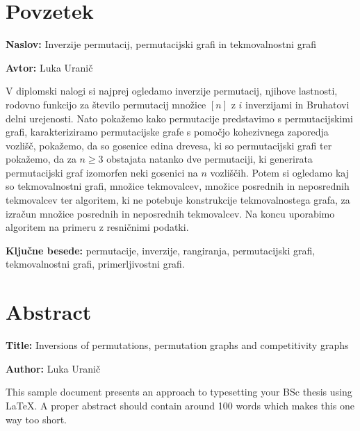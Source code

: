 \documentclass[a4paper, 12pt]{book}
\newcommand{\ttitle}{Inverzije permutacij, permutacijski grafi in tekmovalnostni grafi}
\newcommand{\ttitleEn}{Inversions of permutations, permutation graphs and competitivity graphs}
\newcommand{\tauthor}{Luka Uranič}
\newcommand{\tkeywords}{permutacije, inverzije, rangiranja, permutacijski grafi, tekmovalnostni grafi, primerljivostni grafi}
\newcommand{\clearemptydoublepage}{\newpage{\pagestyle{empty}\cleardoublepage}}
\begin{document}

\chapter*{Povzetek}

\noindent\textbf{Naslov:} \ttitle
\bigskip

\noindent\textbf{Avtor:} \tauthor
\bigskip

\noindent V diplomski nalogi si najprej ogledamo inverzije permutacij, njihove lastnosti, rodovno funkcijo za število permutacij množice $[n]$ z $i$ inverzijami in Bruhatovi delni urejenosti.
Nato pokažemo kako permutacije predstavimo s permutacijskimi grafi, karakteriziramo permutacijske grafe s pomočjo kohezivnega zaporedja vozlišč, pokažemo, da so gosenice edina drevesa, ki so permutacijski grafi ter pokažemo, da za $n \geq 3$ obstajata natanko dve permutaciji, ki generirata permutacijski graf izomorfen neki gosenici na $n$ vozliščih. Potem si ogledamo kaj so tekmovalnostni grafi, množice tekmovalcev, množice posrednih in neposrednih tekmovalcev ter algoritem, ki ne potebuje konstrukcije tekmovalnostega grafa, za izračun množice posrednih in neposrednih tekmovalcev. Na koncu uporabimo algoritem na primeru z resničnimi podatki.


\bigskip

\noindent\textbf{Ključne besede:} \tkeywords.
\clearemptydoublepage

\chapter*{Abstract}

\noindent\textbf{Title:} \ttitleEn
\bigskip

\noindent\textbf{Author:} \tauthor
\bigskip

\noindent This sample document presents an approach to typesetting your BSc thesis using \LaTeX. 
A proper abstract should contain around 100 words which makes this one way too short.
\bigskip
\end{document}
